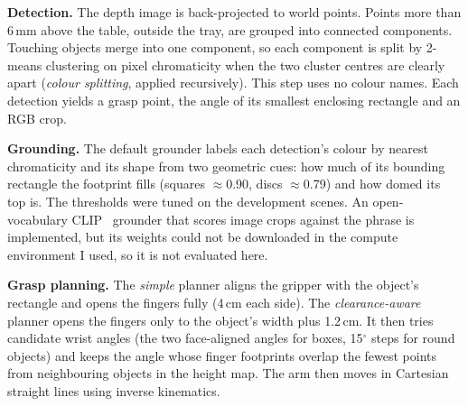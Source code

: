 \documentclass[10pt,a4paper]{article}
\begin{document}
\textbf{Detection.} The depth image is back-projected to world points. Points
more than 6\,mm above the table, outside the tray, are grouped into connected
components. Touching objects merge into one component, so each component is
split by 2-means clustering on pixel chromaticity when the two cluster centres
are clearly apart (\emph{colour splitting}, applied recursively). This step
uses no colour names. Each detection yields a grasp point, the angle of its
smallest enclosing rectangle and an RGB crop.

\textbf{Grounding.} The default grounder labels each detection's colour by
nearest chromaticity and its shape from two geometric cues: how much of its
bounding rectangle the footprint fills (squares $\approx$0.90, discs
$\approx$0.79) and how domed its top is. The thresholds were tuned on the
development scenes. An open-vocabulary CLIP~\cite{clip} grounder that scores
image crops against the phrase is implemented, but its weights could not be
downloaded in the compute environment I used, so it is not evaluated here.

\textbf{Grasp planning.} The \emph{simple} planner aligns the gripper with the
object's rectangle and opens the fingers fully (4\,cm each side). The
\emph{clearance-aware} planner opens the fingers only to the object's width
plus 1.2\,cm. It then tries candidate wrist angles (the two face-aligned angles
for boxes, 15$^\circ$ steps for round objects) and keeps the angle whose finger
footprints overlap the fewest points from neighbouring objects in the height
map. The arm then moves in Cartesian straight lines using inverse kinematics.
\end{document}

